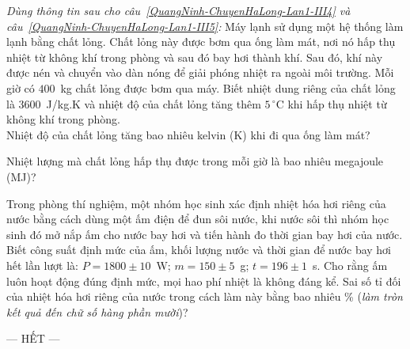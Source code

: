 	\begin{ex}%
		\label{QuangNinh-ChuyenHaLong-Lan1-III4}\textit{Dùng thông tin sau cho câu~\ref{QuangNinh-ChuyenHaLong-Lan1-III4} và câu~\ref{QuangNinh-ChuyenHaLong-Lan1-III5}:} Máy lạnh sử dụng một hệ thống làm lạnh bằng chất lỏng. Chất lỏng này được bơm qua ống làm mát, nơi nó hấp thụ nhiệt từ không khí trong phòng và sau đó bay hơi thành khí. Sau đó, khí này được nén và chuyển vào dàn nóng để giải phóng nhiệt ra ngoài môi trường. Mỗi giờ có $400$~kg chất lỏng được bơm qua máy. Biết nhiệt dung riêng của chất lỏng là $3600$~J/kg.K và nhiệt độ của chất lỏng tăng thêm $5\,^\circ\text{C}$ khi hấp thụ nhiệt từ không khí trong phòng.\\
		Nhiệt độ của chất lỏng tăng bao nhiêu kelvin (K) khi đi qua ống làm mát?
		\par
	\end{ex}

	\begin{ex}%
		\label{QuangNinh-ChuyenHaLong-Lan1-III5}
		Nhiệt lượng mà chất lỏng hấp thụ được trong mỗi giờ là bao nhiêu megajoule (MJ)?
		\par
	\end{ex}

	\begin{ex}%
		Trong phòng thí nghiệm, một nhóm học sinh xác định nhiệt hóa hơi riêng của nước bằng cách dùng một ấm điện để đun sôi nước, khi nước sôi thì nhóm học sinh đó mở nắp ấm cho nước bay hơi và tiến hành đo thời gian bay hơi của nước. Biết công suất định mức của ấm, khối lượng nước và thời gian để nước bay hơi hết lần lượt là: $P=1800\pm 10$~W; $m=150\pm 5$~g; $t=196\pm 1$~s. Cho rằng ấm luôn hoạt động đúng định mức, mọi hao phí nhiệt là không đáng kể. Sai số tỉ đối của nhiệt hóa hơi riêng của nước trong cách làm này bằng bao nhiêu \% (\textit{làm tròn kết quả đến chữ số hàng phần mười})?
		\par
	\end{ex}

	\centerline{--- HẾT ---}


